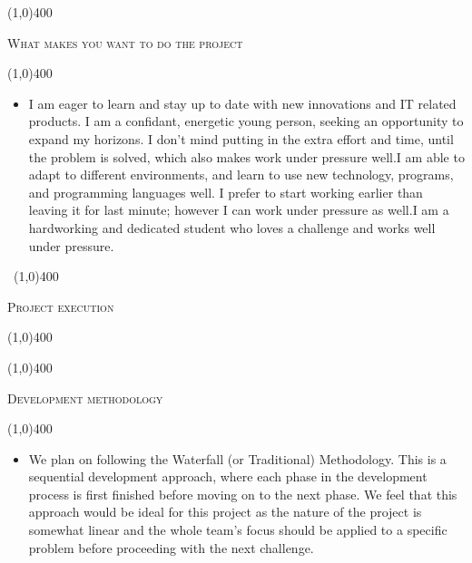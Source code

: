 \documentclass[12pt,a4paper]{report}
\begin{document}
\begin{center}
	
	\line(1,0){400}\\
	{\scshape\large What makes you want to do the project\par}
	\line(1,0){400}\\
	\end{center}
		\begin{itemize}
\item  I am eager to learn and stay up to date with new innovations and IT related products. I am a
confidant, energetic young person, seeking an opportunity to expand my horizons. I don’t
mind putting in the extra effort and time, until the problem is solved, which also makes work
under pressure well.I am able to adapt to different environments, and learn to use new technology, programs,
and programming languages well. I prefer to start working earlier than leaving it for last
minute; however I can work under pressure as well.I am a hardworking and dedicated student who loves a challenge and works well under
pressure.
 

\end{itemize}
\newpage
	\begin{center}
	\vspace*{-3cm}\
	\line(1,0){400}\\
	{\scshape\Large Project execution\par}
	\line(1,0){400}\\
	\end{center}
	
	\begin{center}
	
	\line(1,0){400}\\
	{\scshape\large Development methodology \par}
	\line(1,0){400}\\
	\end{center}
		\begin{itemize}
\item We plan on following the Waterfall (or Traditional) Methodology. This
is a sequential development approach, where each phase in the development 
process is first finished before moving on to the next phase. We feel that this
approach would be ideal for this project as the nature of the project is
somewhat linear and the whole team's focus should be applied to a specific
problem before proceeding with the next challenge.
\end{itemize}
\end{document}
